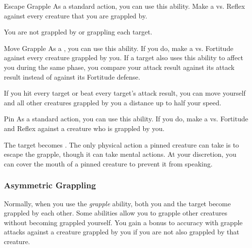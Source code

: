             \begin{ability}{Escape Grapple}
                As a standard action, you can use this ability.
                Make a  vs. Reflex against every creature that you are grappled by.

                \hit You are not grappled by or grappling each target.
            \end{ability}

            \begin{ability}{Move Grapple}
                As a , you can use this ability.
                If you do, make a  vs. Fortitude against every creature grappled by you.
                If a target also uses this ability to affect you during the same phase, you compare your attack result against its attack result instead of against its Fortitude defense.

                If you hit every target or beat every target's attack result, you can move yourself and all other creatures grappled by you a distance up to half your speed.
            \end{ability}

            \begin{ability}{Pin}
                As a standard action, you can use this ability.
                If you do, make a  vs. Fortitude and Reflex against a creature who is grappled by you.

                \hit The target becomes .
                The only physical action a pinned creature can take is to escape the grapple, though it can take mental actions. At your discretion, you can cover the mouth of a pinned creature to prevent it from speaking.
            \end{ability}

        \subsubsection{Asymmetric Grappling}\label{Asymmetric Grappling}
            Normally, when you use the \textit{grapple} ability, both you and the target become grappled by each other.
            Some abilities allow you to grapple other creatures without becoming grappled yourself.
            You gain a  bonus to accuracy with grapple attacks against a creature grappled by you if you are not also grappled by that creature.

